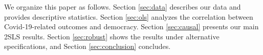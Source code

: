 
We organize this paper as follows. Section \ref{sec:data} describes our data and provides descriptive statistics.  Section \ref{sec:ols} analyzes the correlation between Covid-19-related outcomes and democracy. Section \ref{sec:causal} presents our main 2SLS results. Section \ref{sec:robust} shows the results under alternative specifications, and Section \ref{sec:conclusion} concludes. 